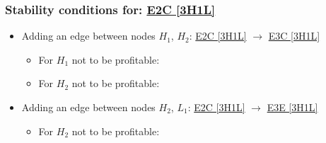 

\subsubsection{Stability conditions for: \hyperref[apx:E2C:3H1L]{E2C [3H1L]}}
\label{apx:E2C:3H1L_stability_cond}

\begin{itemize}

	\item Adding an edge between nodes $H_1$, $H_2$: \hyperref[apx:E2C:3H1L]{E2C [3H1L]} $\to$ \hyperref[apx:E3C:3H1L]{E3C [3H1L]}

	\begin{itemize}

		\item For $H_1$ not to be profitable:


		\item For $H_2$ not to be profitable:


	\end{itemize}

	\item Adding an edge between nodes $H_2$, $L_1$: \hyperref[apx:E2C:3H1L]{E2C [3H1L]} $\to$ \hyperref[apx:E3E:3H1L]{E3E [3H1L]}

	\begin{itemize}

		\item For $H_2$ not to be profitable:


\end{itemize}
\end{itemize}
